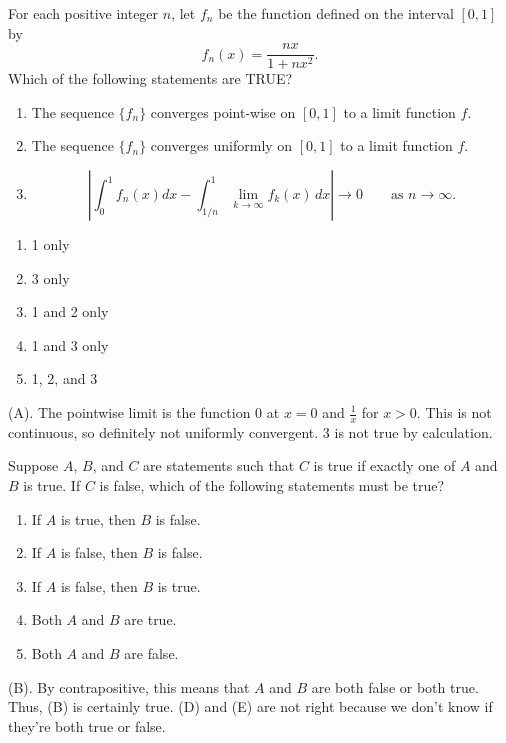 \begin{exercise}
For each positive integer $n$, let $f_n$ be the function defined on the interval $[0,1]$ by
\[
f_n(x)=\frac{nx}{1+nx^2}.
\]
Which of the following statements are TRUE?

\begin{enumerate}
    \item The sequence $\{f_n\}$ converges point-wise on $[0,1]$ to a limit function $f$.
    
    \item The sequence $\{f_n\}$ converges uniformly on $[0,1]$ to a limit function $f$.
    
    \item
    \[
    \left|
    \int_0^1 f_n(x) dx
    -
    \int_{1/n}^1 \lim_{k\to\infty} f_k(x)\,dx
    \right|
    \to 0
    \qquad\text{as }n\to\infty.
    \]
\end{enumerate}

\begin{enumerate}[label=(\Alph*)]
    \item 1 only
    \item 3 only
    \item 1 and 2 only
    \item 1 and 3 only
    \item 1, 2, and 3
\end{enumerate}
\end{exercise}
\begin{solution}
(A). The pointwise limit is the function $0$ at $x = 0$ and $\frac{1}{x}$ for $x > 0$.
This is not continuous, so definitely not uniformly convergent. 3 is not true by calculation.
\end{solution}

\begin{exercise}
Suppose $A$, $B$, and $C$ are statements such that $C$ is true if exactly one of $A$ and $B$ is true. If $C$ is false, which of the following statements must be true?

\begin{enumerate}[label=(\Alph*)]
    \item If $A$ is true, then $B$ is false.
    \item If $A$ is false, then $B$ is false.
    \item If $A$ is false, then $B$ is true.
    \item Both $A$ and $B$ are true.
    \item Both $A$ and $B$ are false.
\end{enumerate}
\end{exercise}
\begin{solution}
(B). By contrapositive, this means that $A$ and $B$ are both false or both true. Thus, (B) is 
certainly true. (D) and (E) are not right because we don't know if they're both true or false.
\end{solution}

